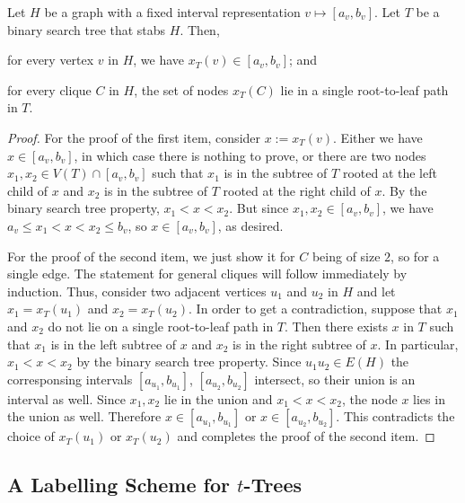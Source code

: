 \documentclass[kpfonts]{patmorin}
\let\le\leqslant
\begin{document}
\begin{lem}
Let $H$ be a graph with a fixed interval representation $v\mapsto[a_v,b_v]$. 
Let $T$ be a binary search tree that stabs $H$. 
Then,
\begin{compactenum}
  \item for every vertex $v$ in $H$, we have $x_{T}(v) \in [a_v,b_v]$; and
  \label{itm:v-in-its-interval}
  \item for every clique $C$ in $H$, the set of nodes $x_T(C)$ lie in a single root-to-leaf path in $T$.
  \label{itm:clique-on-a-single-path}
\end{compactenum}
\end{lem}
\begin{proof}
  For the proof of the first item, consider $x:=x_T(v)$.
  Either we have $x\in [a_v,b_v]$, in which case there is nothing to prove, 
  or there are two nodes $x_1,x_2\in V(T)\cap[a_v,b_v]$ such that $x_1$ is in the subtree of $T$ rooted at the left child of $x$ and $x_2$ is in the subtree of $T$ rooted at the right child of $x$.  
  By the binary search tree property, $x_1<x<x_2$. 
  But since $x_1,x_2 \in [a_v,b_v]$, we have $a_v\le x_1<x<x_2\le b_v$, so $x\in [a_v,b_v]$, as desired.

  For the proof of the second item, we just show it for $C$ being of size $2$, so for a single edge. 
  The statement for general cliques will follow immediately by induction.
  Thus, consider two adjacent vertices $u_1$ and $u_2$ in $H$ and 
  let $x_1=x_T(u_1)$ and $x_2=x_T(u_2)$.
  In order to get a contradiction, suppose that $x_1$ and $x_2$ do not lie on a single root-to-leaf path in $T$. 
  Then there exists $x$ in $T$ such that $x_1$ is in the left subtree of $x$ and $x_2$ is in the right subtree of $x$.
  In particular, $x_1 < x < x_2$ by the binary search tree property.
  Since $u_1u_2 \in E(H)$ the corresponsing intervals $[a_{u_1},b_{u_1}]$, $[a_{u_2}, b_{u_2}]$ intersect, so their union is an interval as well. 
  Since $x_1,x_2$ lie in the union and $x_1 < x < x_2$, the node $x$ lies in the union as well.
  Therefore $x\in[a_{u_1},b_{u_1}]$ or $x\in [a_{u_2}, b_{u_2}]$. 
  This contradicts the choice of $x_T(u_1)$ or $x_T(u_2)$ and completes the proof of the second item.
\end{proof}

\subsection{A Labelling Scheme for $t$-Trees}
\end{document}
